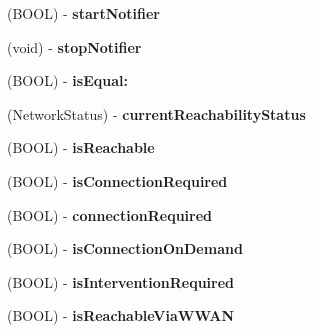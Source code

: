 \begin{DoxyCompactItemize}
\item 
\hypertarget{interface_reachability_ae20732960a222681fcc7caeb191158bc}{
(\-B\-O\-O\-L) -\/ {\bfseries start\-Notifier}}
\label{interface_reachability_ae20732960a222681fcc7caeb191158bc}

\item 
\hypertarget{interface_reachability_ab7907e9c8de0e4e15774e82c089e0b39}{
(void) -\/ {\bfseries stop\-Notifier}}
\label{interface_reachability_ab7907e9c8de0e4e15774e82c089e0b39}

\item 
\hypertarget{interface_reachability_a7158fbf023168ca543a1340d6b3ce7fb}{
(\-B\-O\-O\-L) -\/ {\bfseries is\-Equal\-:}}
\label{interface_reachability_a7158fbf023168ca543a1340d6b3ce7fb}

\item 
\hypertarget{interface_reachability_a8396438436e7ff3770039fb527cd1d34}{
(\-Network\-Status) -\/ {\bfseries current\-Reachability\-Status}}
\label{interface_reachability_a8396438436e7ff3770039fb527cd1d34}

\item 
\hypertarget{interface_reachability_ae0b18fcacc97f538502cf671aa583dbd}{
(\-B\-O\-O\-L) -\/ {\bfseries is\-Reachable}}
\label{interface_reachability_ae0b18fcacc97f538502cf671aa583dbd}

\item 
\hypertarget{interface_reachability_a294f9407cd32a05f26a480871df70901}{
(\-B\-O\-O\-L) -\/ {\bfseries is\-Connection\-Required}}
\label{interface_reachability_a294f9407cd32a05f26a480871df70901}

\item 
\hypertarget{interface_reachability_a731496d70dd8bfbd1b364df13cac2b4c}{
(\-B\-O\-O\-L) -\/ {\bfseries connection\-Required}}
\label{interface_reachability_a731496d70dd8bfbd1b364df13cac2b4c}

\item 
\hypertarget{interface_reachability_af5bea7c2cfd6439a4ff5f0ab0b92e37b}{
(\-B\-O\-O\-L) -\/ {\bfseries is\-Connection\-On\-Demand}}
\label{interface_reachability_af5bea7c2cfd6439a4ff5f0ab0b92e37b}

\item 
\hypertarget{interface_reachability_ad44af2ebf5ffd986dacad06e63362550}{
(\-B\-O\-O\-L) -\/ {\bfseries is\-Intervention\-Required}}
\label{interface_reachability_ad44af2ebf5ffd986dacad06e63362550}

\item 
\hypertarget{interface_reachability_a20011128b407d36659bc78a64cd583f5}{
(\-B\-O\-O\-L) -\/ {\bfseries is\-Reachable\-Via\-W\-W\-A\-N}}
\label{interface_reachability_a20011128b407d36659bc78a64cd583f5}


\end{DoxyCompactItemize}
